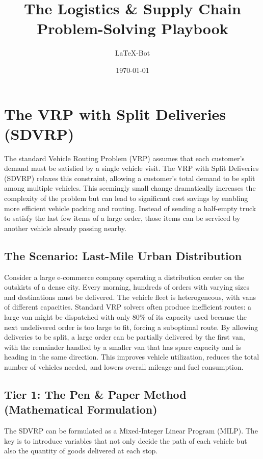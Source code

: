 \documentclass{article}
\title{\textbf{The Logistics \& Supply Chain Problem-Solving Playbook}}
\author{LaTeX-Bot}
\date{\today}
\begin{document}
\maketitle

\section{The VRP with Split Deliveries (SDVRP)}
The standard Vehicle Routing Problem (VRP) assumes that each customer's demand must be satisfied by a single vehicle visit. The VRP with Split Deliveries (SDVRP) relaxes this constraint, allowing a customer's total demand to be split among multiple vehicles. This seemingly small change dramatically increases the complexity of the problem but can lead to significant cost savings by enabling more efficient vehicle packing and routing. Instead of sending a half-empty truck to satisfy the last few items of a large order, those items can be serviced by another vehicle already passing nearby.

\subsection{The Scenario: Last-Mile Urban Distribution}
Consider a large e-commerce company operating a distribution center on the outskirts of a dense city. Every morning, hundreds of orders with varying sizes and destinations must be delivered. The vehicle fleet is heterogeneous, with vans of different capacities. Standard VRP solvers often produce inefficient routes: a large van might be dispatched with only 80\% of its capacity used because the next undelivered order is too large to fit, forcing a suboptimal route. By allowing deliveries to be split, a large order can be partially delivered by the first van, with the remainder handled by a smaller van that has spare capacity and is heading in the same direction. This improves vehicle utilization, reduces the total number of vehicles needed, and lowers overall mileage and fuel consumption.

\subsection{Tier 1: The Pen \& Paper Method (Mathematical Formulation)}
The SDVRP can be formulated as a Mixed-Integer Linear Program (MILP). The key is to introduce variables that not only decide the path of each vehicle but also the quantity of goods delivered at each stop.
\end{document}
